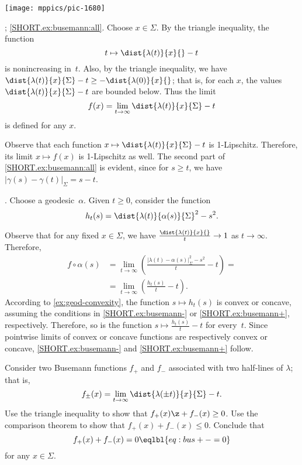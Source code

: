 \begin{Figure}
\vskip-0mm
\centering
\texttt{[image: mppics/pic-1680]}
\vskip0mm
\end{Figure}

\parbf{\ref{ex:busemann}}; \ref{SHORT.ex:busemann:all}.
Choose $x\in\Sigma$.
By the triangle inequality, the function 
\[t\mapsto\dist{\lambda(t)}{x}{}- t\]
is nonincreasing in~$t$. 
Also, by the triangle inequality, we have
$\dist{\lambda(t)}{x}{\Sigma}- t\ge-\dist{\lambda(0)}{x}{}$;
that is, for each $x$, the values $\dist{\lambda(t)}{x}{\Sigma}- t$ are bounded below.
Thus the limit
\[f(x)=\lim_{t\to\infty}\dist{\lambda(t)}{x}{\Sigma}- t\]
is defined for any $x$.

Observe that each function $x\mapsto \dist{\lambda(t)}{x}{\Sigma}- t$ is 1-Lipschitz.
Therefore, its limit $x\mapsto f(x)$ is 1-Lipschitz as well.
The second part of \ref{SHORT.ex:busemann:all} is evident, since for $s \geq t$, we have $| \gamma (s) - \gamma (t) |_{\Sigma} = s-t$.

\parit{\ref{SHORT.ex:busemann-} $+$ \ref{SHORT.ex:busemann+}}.
Choose a geodesic~$\alpha$.
Given $t\ge 0$, consider the function 
\[h_t(s)=\dist{\lambda(t)}{\alpha(s)}{\Sigma}^2-s^2.\]

Observe that for any fixed $x\in\Sigma$, we have $\tfrac{\dist{\lambda(t)}{x}{}}t\to 1$ as $t\to\infty$.
Therefore,
\begin{align*}
f\!\circ\alpha(s)
&=\!
\lim_{t\to\infty}\left(\frac{| \lambda (t) - \alpha (s) |_{\Sigma}^2 - s^2 }{t} -t\right)=
\\
&=
\lim_{t\to\infty}\left(\frac{h_t(s)}{t} -t\right).
\end{align*}
According to \ref{ex:geod-convexity}, the function 
$s\mapsto h_t(s)$ is convex or concave, assuming the conditions in \ref{SHORT.ex:busemann-} or \ref{SHORT.ex:busemann+}, respectively.
Therefore, so is the function
$s \mapsto \tfrac{h_t(s)}{t} -t$
for every~$t$.
Since pointwise limits of convex or concave functions are respectively convex or concave, \ref{SHORT.ex:busemann-} and \ref{SHORT.ex:busemann+} follow.

Consider two Busemann functions $f_+$ and $f_-$ associated with two half-lines of
$\lambda$; that is,
\[
f_\pm(x)
=
\lim_{t\to\infty}\dist{\lambda(\pm t)}{x}{\Sigma}- t.
\]
Use the triangle inequality to show that $f_+(x)\z+f_-(x)\ge 0$.
Use the comparison theorem to show that $f_+(x)+f_-(x)\le 0$.
Conclude that
\[
f_+(x)+f_-(x)= 0
\eqlbl{eq:bus+-=0}
\]
for any $x\in \Sigma$.

